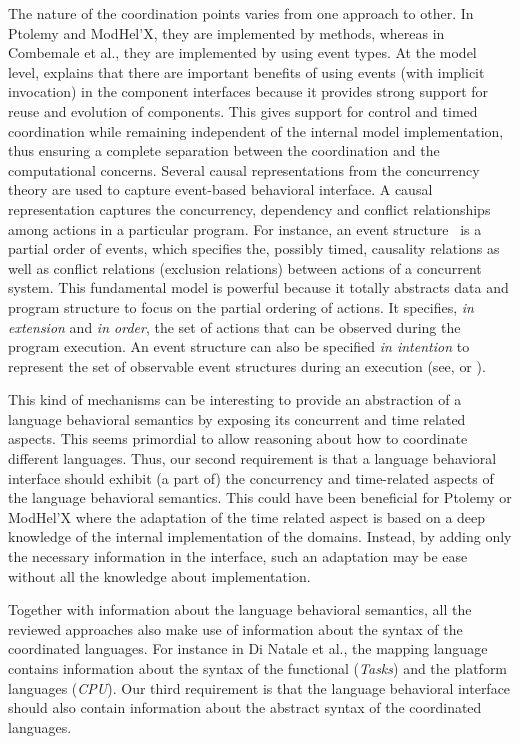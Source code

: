 {The nature of the coordination points varies from one approach to other. In Ptolemy and ModHel'X, they are implemented by methods, whereas in Combemale et al., they are implemented by using event types. At the model level, \cite{garlansoftarchbib} explains that there are important benefits of using events (with implicit invocation) in the component interfaces because it provides strong support for reuse and evolution of components. This gives support for control and timed coordination while remaining independent of the internal model implementation, thus ensuring a complete separation between the coordination and the computational concerns. Several causal representations from the concurrency theory are used to capture event-based behavioral interface. A causal representation captures the concurrency, dependency and conflict relationships among actions in a particular program. For instance, an event structure~\cite{eventStructures} is a partial order of events, which specifies the, possibly timed, causality relations as well as conflict relations (\ie exclusion relations) between actions of a concurrent system. This fundamental model is powerful because it totally abstracts data and program structure to focus on the partial ordering of actions. It specifies, \emph{in extension} and \emph{in order}, the set of actions that can be observed during the program execution. An event structure can also be specified \emph{in intention} to represent the set of observable event structures during an execution (see, \eg\cite{ccslbib} or \cite{tagmachinebib}). 

This kind of mechanisms can be interesting to provide an abstraction of a language behavioral semantics by exposing its concurrent and time related aspects. This seems primordial to allow reasoning about how to coordinate different languages. Thus, our second requirement is that a language behavioral interface should exhibit (a part of) the concurrency and time-related aspects of the language behavioral semantics. This could have been beneficial for Ptolemy or ModHel'X where the adaptation of the time related aspect is based on a deep knowledge of the internal implementation of the domains. Instead, by adding only the necessary information in the interface, such an adaptation may be ease without all the knowledge about implementation. 

Together with information about the language behavioral semantics, all the reviewed approaches also make use of information about the syntax of the coordinated languages. For instance in Di Natale et al., the mapping language contains information about the syntax of the functional (\eg \emph{Tasks}) and the platform languages (\eg \emph{CPU}). Our third requirement is that the language behavioral interface should also contain information about the abstract syntax of the coordinated languages.     

}
